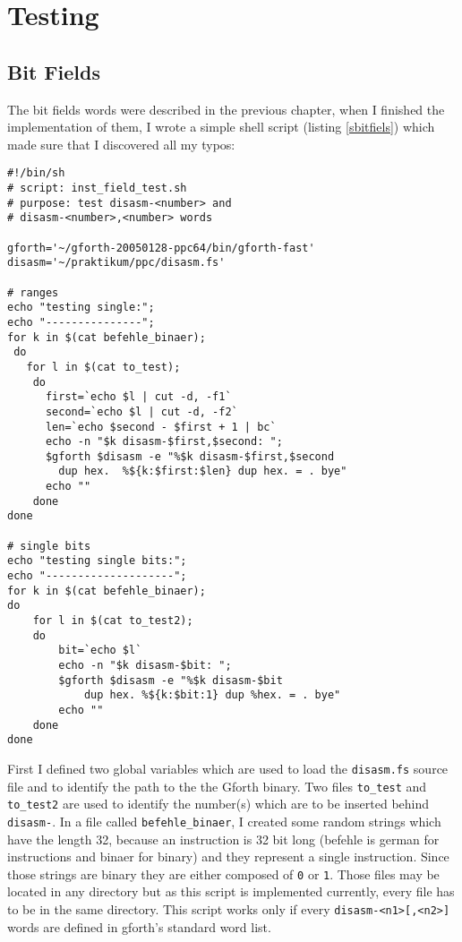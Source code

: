 \section{Testing}

\subsection{Bit Fields}

The bit fields words were described in the previous chapter, when I finished the
implementation of them, I wrote a simple shell script (listing \ref{sbitfiels})
which made sure that I discovered all my typos:

\begin{lstlisting}[float, caption=Bit fields test script, label=sbitfiels]
#!/bin/sh
# script: inst_field_test.sh
# purpose: test disasm-<number> and 
# disasm-<number>,<number> words

gforth='~/gforth-20050128-ppc64/bin/gforth-fast'
disasm='~/praktikum/ppc/disasm.fs'

# ranges
echo "testing single:";
echo "---------------";
for k in $(cat befehle_binaer);
 do
   for l in $(cat to_test);
    do
      first=`echo $l | cut -d, -f1`
      second=`echo $l | cut -d, -f2`
      len=`echo $second - $first + 1 | bc`
      echo -n "$k disasm-$first,$second: ";
      $gforth $disasm -e "%$k disasm-$first,$second 
        dup hex.  %${k:$first:$len} dup hex. = . bye"
      echo ""
    done
done

# single bits
echo "testing single bits:";
echo "--------------------";
for k in $(cat befehle_binaer);
do
    for l in $(cat to_test2);
    do
        bit=`echo $l`
        echo -n "$k disasm-$bit: ";
        $gforth $disasm -e "%$k disasm-$bit 
            dup hex. %${k:$bit:1} dup %hex. = . bye"
        echo ""
    done
done
\end{lstlisting}

First I defined two global variables which are used to load the
\texttt{disasm.fs} source file and to identify the path to the 
the Gforth binary. Two files \texttt{to\_test} and \texttt{to\_test2} are used
to identify the number(s) which are to be inserted behind \texttt{disasm-}.
In a file called \texttt{befehle\_binaer}, I created some random strings which
have the length 32, because an instruction is 32 bit long (befehle is german for
instructions and binaer for binary) and they represent a single instruction. 
Since those strings are binary they are either composed of \texttt{0} or 
\texttt{1}. Those files may be located in any directory but as this script is
implemented currently, every file has to be in the same directory. This script
works only if every \texttt{disasm-<n1>[,<n2>]} words are defined in gforth's
standard word list.

